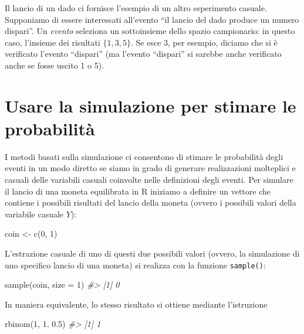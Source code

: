 \documentclass[
  11pt,
]{krantz}
\makeatletter
\newenvironment{Shaded}{\begin{snugshade}}{\end{snugshade}}
\newcommand{\AttributeTok}[1]{\textcolor[rgb]{0.61,0.61,0.61}{#1}}
\newcommand{\CommentTok}[1]{\textcolor[rgb]{0.37,0.37,0.37}{\textit{#1}}}
\newcommand{\DecValTok}[1]{\textcolor[rgb]{0.06,0.06,0.06}{#1}}
\newcommand{\FloatTok}[1]{\textcolor[rgb]{0.06,0.06,0.06}{#1}}
\newcommand{\FunctionTok}[1]{\textcolor[rgb]{0,0,0}{#1}}
\newcommand{\NormalTok}[1]{#1}
\newcommand{\OtherTok}[1]{\textcolor[rgb]{0.37,0.37,0.37}{#1}}
\newenvironment{kframe}{%
\medskip{}
\setlength{\fboxsep}{.8em}
 \def\at@end@of@kframe{}%
 \ifinner\ifhmode%
  \def\at@end@of@kframe{\end{minipage}}%
  \begin{minipage}{\columnwidth}%
 \fi\fi%
 \def\FrameCommand##1{\hskip\@totalleftmargin \hskip-\fboxsep
 \colorbox{shadecolor}{##1}\hskip-\fboxsep
     \hskip-\linewidth \hskip-\@totalleftmargin \hskip\columnwidth}%
 \MakeFramed {\advance\hsize-\width
   \@totalleftmargin\z@ \linewidth\hsize
   \@setminipage}}%
 {\par\unskip\endMakeFramed%
 \at@end@of@kframe}
\renewenvironment{Shaded}{\begin{kframe}}{\end{kframe}}
\theoremstyle{definition}
\theoremstyle{definition}
\theoremstyle{definition}
\theoremstyle{definition}
\theoremstyle{remark}
\makeatother
\begin{document}
Il lancio di un dado ci fornisce l'esempio di un altro esperimento casuale. Supponiamo di essere interessati all'evento ``il lancio del dado produce un numero dispari''. Un \emph{evento} seleziona un sottoinsieme dello spazio campionario: in questo caso, l'insieme dei risultati \(\{1, 3, 5\}\). Se esce 3, per esempio, diciamo che si è verificato l'evento ``dispari'' (ma l'evento ``dispari'' si sarebbe anche verificato anche se fosse uscito 1 o 5).

\hypertarget{usare-la-simulazione-per-stimare-le-probabilituxe0}{%
\section{Usare la simulazione per stimare le probabilità}\label{usare-la-simulazione-per-stimare-le-probabilituxe0}}

I metodi basati sulla simulazione ci consentono di stimare le probabilità degli eventi in un modo diretto se siamo in grado di generare realizzazioni molteplici e casuali delle variabili casuali coinvolte nelle definizioni degli eventi. Per simulare il lancio di una moneta equilibrata in R iniziamo a definire un vettore che contiene i possibili risultati del lancio della moneta (ovvero i possibili valori della variabile casuale \(Y\)):

\begin{Shaded}
\begin{Highlighting}[]
\NormalTok{coin }\OtherTok{\textless{}{-}} \FunctionTok{c}\NormalTok{(}\DecValTok{0}\NormalTok{, }\DecValTok{1}\NormalTok{)}
\end{Highlighting}
\end{Shaded}

\noindent L'estrazione casuale di uno di questi due possibili valori (ovvero, la simulazione di uno specifico lancio di una moneta) si realizza con la funzione \texttt{sample()}:

\begin{Shaded}
\begin{Highlighting}[]
\FunctionTok{sample}\NormalTok{(coin, }\AttributeTok{size =} \DecValTok{1}\NormalTok{)}
\CommentTok{\#\textgreater{} [1] 0}
\end{Highlighting}
\end{Shaded}

\noindent In maniera equivalente, lo stesso risultato si ottiene mediante l'istruzione

\begin{Shaded}
\begin{Highlighting}[]
\FunctionTok{rbinom}\NormalTok{(}\DecValTok{1}\NormalTok{, }\DecValTok{1}\NormalTok{, }\FloatTok{0.5}\NormalTok{)}
\CommentTok{\#\textgreater{} [1] 1}
\end{Highlighting}
\end{Shaded}
\end{document}
